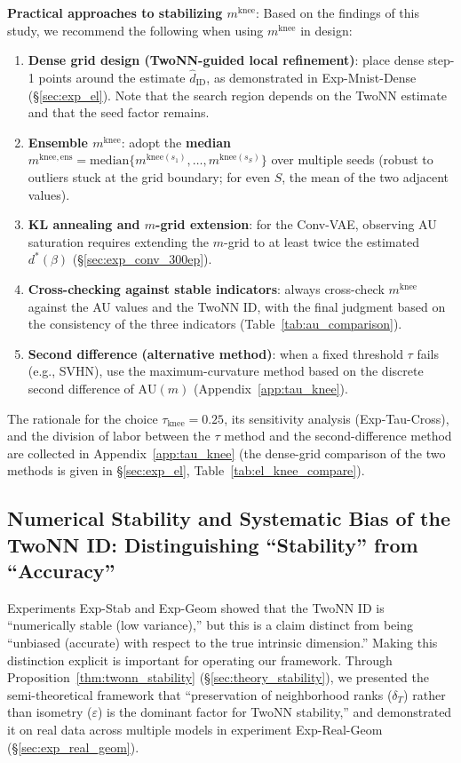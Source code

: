 \documentclass[make,article,submit,pdftex,moreauthors]{Definitions/mdpi}
\newcommand{\mknee}{m^{\mathrm{knee}}}
\begin{document}
\textbf{Practical approaches to stabilizing $\mknee$}:
Based on the findings of this study, we recommend the following when using $\mknee$
in design:
\begin{enumerate}
  \item \textbf{Dense grid design (TwoNN-guided local refinement)}: place dense
        step-1 points around the estimate $\hat{d}_\mathrm{ID}$, as demonstrated in
        Exp-Mnist-Dense (\S\ref{sec:exp_el}).
        Note that the search region depends on the TwoNN estimate and that the seed
        factor remains.
  \item \textbf{Ensemble $\mknee$}: adopt the \textbf{median}
        $m^{\mathrm{knee,ens}} = \mathrm{median}\{m^{\mathrm{knee}(s_1)}, \ldots, m^{\mathrm{knee}(s_S)}\}$
        over multiple seeds (robust to outliers stuck at the grid boundary; for even
        $S$, the mean of the two adjacent values).
  \item \textbf{KL annealing and $m$-grid extension}: for the Conv-VAE, observing AU
        saturation requires extending the $m$-grid to at least twice the estimated
        $d^*(\beta)$ (\S\ref{sec:exp_conv_300ep}).
  \item \textbf{Cross-checking against stable indicators}: always cross-check $\mknee$
        against the AU values and the TwoNN ID, with the final judgment based on the
        consistency of the three indicators (Table~\ref{tab:au_comparison}).
  \item \textbf{Second difference (alternative method)}: when a fixed threshold $\tau$
        fails (e.g., SVHN), use the maximum-curvature method based on the discrete
        second difference of $\mathrm{AU}(m)$ (Appendix~\ref{app:tau_knee}).
\end{enumerate}

The rationale for the choice $\tau_{\mathrm{knee}} = 0.25$, its sensitivity analysis
(Exp-Tau-Cross), and the division of labor between the $\tau$ method and the
second-difference method are collected in Appendix~\ref{app:tau_knee}
(the dense-grid comparison of the two methods is given in \S\ref{sec:exp_el},
Table~\ref{tab:el_knee_compare}).

\subsection{Numerical Stability and Systematic Bias of the TwoNN ID: Distinguishing ``Stability'' from ``Accuracy''}\label{sec:disc_twonn_bias}

Experiments Exp-Stab and Exp-Geom showed that the TwoNN ID is ``numerically stable
(low variance),'' but this is a claim distinct from being ``unbiased (accurate) with
respect to the true intrinsic dimension.''
Making this distinction explicit is important for operating our framework.
Through Proposition~\ref{thm:twonn_stability} (\S\ref{sec:theory_stability}), we
presented the semi-theoretical framework that ``preservation of neighborhood ranks
($\delta_T$) rather than isometry ($\varepsilon$) is the dominant factor for TwoNN
stability,'' and demonstrated it on real data across multiple models in experiment
Exp-Real-Geom (\S\ref{sec:exp_real_geom}).
\end{document}
